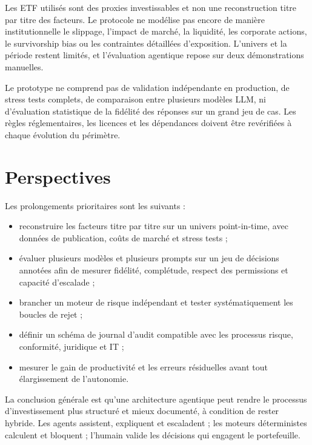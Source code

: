 Les ETF utilisés sont des proxies investissables et non une reconstruction titre par titre des facteurs. Le protocole ne modélise pas encore de manière institutionnelle le slippage, l'impact de marché, la liquidité, les corporate actions, le survivorship bias ou les contraintes détaillées d'exposition. L'univers et la période restent limités, et l'évaluation agentique repose sur deux démonstrations manuelles.

Le prototype ne comprend pas de validation indépendante en production, de stress tests complets, de comparaison entre plusieurs modèles LLM, ni d'évaluation statistique de la fidélité des réponses sur un grand jeu de cas. Les règles réglementaires, les licences et les dépendances doivent être revérifiées à chaque évolution du périmètre.

\section{Perspectives}

Les prolongements prioritaires sont les suivants :

\begin{itemize}
    \item reconstruire les facteurs titre par titre sur un univers point-in-time, avec données de publication, coûts de marché et stress tests ;
    \item évaluer plusieurs modèles et plusieurs prompts sur un jeu de décisions annotées afin de mesurer fidélité, complétude, respect des permissions et capacité d'escalade ;
    \item brancher un moteur de risque indépendant et tester systématiquement les boucles de rejet ;
    \item définir un schéma de journal d'audit compatible avec les processus risque, conformité, juridique et IT ;
    \item mesurer le gain de productivité et les erreurs résiduelles avant tout élargissement de l'autonomie.
\end{itemize}

La conclusion générale est qu'une architecture agentique peut rendre le processus d'investissement plus structuré et mieux documenté, à condition de rester hybride. Les agents assistent, expliquent et escaladent ; les moteurs déterministes calculent et bloquent ; l'humain valide les décisions qui engagent le portefeuille.

